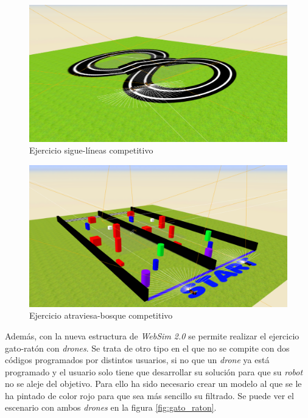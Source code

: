 \begin{itemize}
    \begin{figure}[H]
        \centering            
        \includegraphics[scale=0.3]{img/ejercicio_siguelineas.png}
        \caption{Ejercicio sigue-líneas competitivo}
        \label{fig:siguelineas_competitivo}
    \end{figure}
    \begin{figure}[H]
        \centering           
        \includegraphics[scale=0.3]{img/ejercicio_atraviesabosque.png}
        \caption{Ejercicio atraviesa-bosque competitivo}
        \label{fig:atraviesabosque_escenario}
    \end{figure}

\end{itemize}

Además, con la nueva estructura de \textit{WebSim 2.0} se permite realizar el ejercicio gato-ratón con \textit{drones}. Se trata de otro tipo en el que no se compite con dos códigos programados por distintos usuarios, si no que un \textit{drone} ya está programado y el usuario solo tiene que desarrollar su solución para que su \textit{robot} no se aleje del objetivo. Para ello ha sido necesario crear un modelo al que se le ha pintado de color rojo para que sea más sencillo su filtrado. Se puede ver el escenario con ambos \textit{drones} en la figura \ref{fig:gato_raton}.

